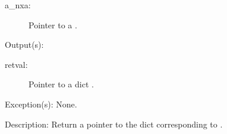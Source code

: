 \begin{capi}
\begin{capilist}
\begin{description}
		\item[a\_nxa: ]
			Pointer to a .
		\end{description}
	\item[Output(s): ]
		\begin{description}\item[]
		\item[retval: ]
			Pointer to a dict .
		\end{description}
	\item[Exception(s): ] None.
	\item[Description: ]
		Return a pointer to the dict  corresponding to
		.
	\end{capilist}
\end{capi}
